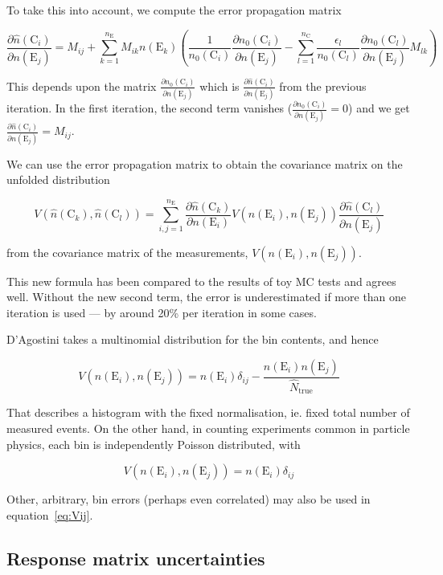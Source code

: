 \documentclass[12pt,a4paper]{article}
\newcommand{\E}{\mathrm{E}}
\newcommand{\C}{\mathrm{C}}
\newcommand{\dd}[2]{\frac{\partial{#1}}{\partial{#2}}}
\begin{document}
To take this into account, we compute the error propagation matrix

\begin{equation}
\dd{\hat{n}(\C_i)}{n(\E_j)} = M_{ij} + \sum_{k=1}^{n_{\E}} M_{ik} n(\E_k)
\left( \frac{1}{n_0(\C_i)} \dd{n_0(\C_i)}{n(\E_j)} - \sum_{l=1}^{n_{\C}} \frac{\epsilon_l}{n_0(\C_l)} \dd{n_0(\C_l)}{n(\E_j)} M_{lk} \right)
\end{equation}

This depends upon the matrix $\dd{n_0(\C_i)}{n(\E_j)}$ which is $\dd{\hat{n}(\C_i)}{n(\E_j)}$ from the previous iteration.
In the first iteration, the second term vanishes ($\dd{n_0(\C_i)}{n(\E_j)}=0$) and we get $\dd{\hat{n}(\C_i)}{n(\E_j)} = M_{ij}$.

We can use the error propagation matrix to obtain the covariance matrix on the unfolded distribution

\begin{equation}
V(\hat{n}(\C_k),\hat{n}(\C_l)) = \sum_{i,j=1}^{n_{\E}} \dd{\hat{n}(\C_k)}{n(\E_i)} V(n(\E_i),n(\E_j)) \dd{\hat{n}(\C_l)}{n(\E_j)}
\label{eq:Vij}
\end{equation}

\noindent from the covariance matrix of the measurements, $V(n(\E_i),n(\E_j))$.

This new formula has been compared to the results of toy MC tests and agrees well.
Without the new second term, the error is underestimated if more than one iteration
is used --- by around 20\% per iteration in some cases.

D'Agostini takes a multinomial distribution for the bin contents, and hence

\begin{equation}
V(n(\E_i),n(\E_j)) = n(\E_i) \delta_{ij} - \frac{n(\E_i) n(\E_j)}{\hat{N}_{\mathrm{true}}}
\end{equation}

That describes a histogram with the fixed normalisation, ie. fixed total number of measured events.
On the other hand, in counting experiments common in particle physics, each bin is independently Poisson distributed, with

\begin{equation}
V(n(\E_i),n(\E_j)) = n(\E_i) \delta_{ij}
\end{equation}

Other, arbitrary, bin errors (perhaps even correlated) may also be used in equation~\ref{eq:Vij}.

\subsection{Response matrix uncertainties}
\end{document}
